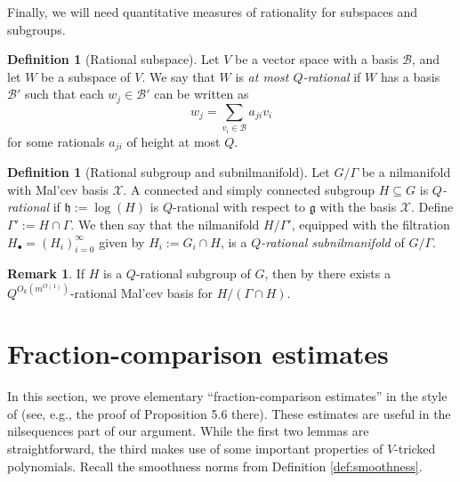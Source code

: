 \documentclass[11pt]{amsart}
\theoremstyle{definition}
\newtheorem{definition}[lemma]{Definition}
\newtheorem*{remark}{Remark}
\begin{document}
Finally, we will need quantitative measures of rationality for subspaces and subgroups.
\begin{definition}[Rational subspace]
Let $V$ be a vector space with a basis $\mathcal{B}$, and let $W$ be a subspace of $V$. We say that $W$ is \emph{at most $Q$-rational} if $W$ has a basis $\mathcal{B}'$ such that each $w_j\in \mathcal{B}'$ can be written as
\[w_j = \sum_{v_i\in \mathcal{B}} a_{ji} v_i\]
for some rationals $a_{ji}$ of height at most $Q$.
\end{definition}
\begin{definition}[Rational subgroup and subnilmanifold]
Let $G/\Gamma$ be a nilmanifold with Mal'cev basis $\mathcal{X}$.
A connected and simply connected subgroup $H\subseteq G$ is \textit{$Q$-rational} if $\mathfrak{h} := \log(H)$ is $Q$-rational with respect to $\mathfrak{g}$ with the basis $\mathcal{X}$.  Define $\Gamma':=H\cap\Gamma$.  We then say that the nilmanifold $H/\Gamma'$, equipped with the filtration $H_\bullet = (H_i)_{i=0}^\infty$ given by $H_i := G_i\cap H$, is a \textit{$Q$-rational subnilmanifold} of $G/\Gamma$.
\end{definition}
\begin{remark}
If $H$ is a $Q$-rational subgroup of $G$, then by \cite[Lemma B.12]{Leng23a} there exists a $Q^{O_k(m^{O(1)})}$-rational Mal'cev basis for $H/(\Gamma \cap H)$.
\end{remark}



\section{Fraction-comparison estimates}\label{A: fraction comparison}
In this section, we prove elementary ``fraction-comparison estimates'' in the style of \cite{PSS23} (see, e.g., the proof of Proposition 5.6 there).  These estimates are useful in the nilsequences part of our argument.  While the first two lemmas are straightforward, the third makes use of some important properties of $V$-tricked polynomials.  Recall the smoothness norms from Definition \ref{def:smoothness}.
\end{document}
